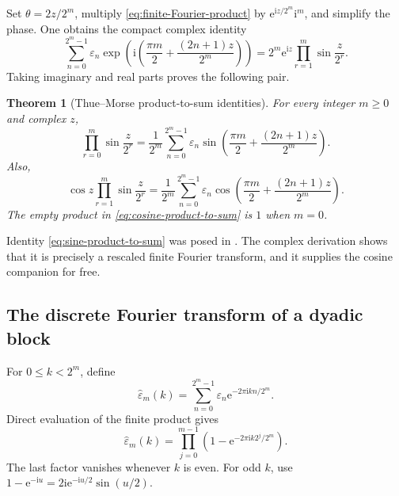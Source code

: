 \documentclass[11pt,oneside]{article}
\newtheorem{theorem}{Theorem}[section]
\theoremstyle{definition}
\theoremstyle{remark}
\newcommand{\e}{\mathrm e}
\newcommand{\ii}{\mathrm i}
\newcommand{\eps}{\varepsilon}
\begin{document}
Set \(\theta=2z/2^m\), multiply
\eqref{eq:finite-Fourier-product} by
\(\e^{\ii z/2^m}\ii^m\), and simplify the phase.  One obtains the compact
complex identity
\begin{equation}
  \sum_{n=0}^{2^m-1}\eps_n
   \exp\!\left(\ii\left(
      \frac{\pi m}{2}+\frac{(2n+1)z}{2^m}
   \right)\right)
  =2^m\e^{\ii z}\prod_{r=1}^{m}\sin\frac{z}{2^r}.
  \label{eq:complex-product-to-sum}
\end{equation}
Taking imaginary and real parts proves the following pair.

\begin{theorem}[Thue--Morse product-to-sum identities]
For every integer \(m\ge0\) and complex \(z\),
\begin{equation}
  \boxed{
  \prod_{r=0}^{m}\sin\frac{z}{2^r}
   =\frac1{2^m}\sum_{n=0}^{2^m-1}\eps_n
     \sin\!\left(
       \frac{\pi m}{2}+\frac{(2n+1)z}{2^m}
     \right).}
  \label{eq:sine-product-to-sum}
\end{equation}
Also,
\begin{equation}
  \boxed{
  \cos z\prod_{r=1}^{m}\sin\frac{z}{2^r}
   =\frac1{2^m}\sum_{n=0}^{2^m-1}\eps_n
     \cos\!\left(
       \frac{\pi m}{2}+\frac{(2n+1)z}{2^m}
     \right).}
  \label{eq:cosine-product-to-sum}
\end{equation}
The empty product in \eqref{eq:cosine-product-to-sum} is \(1\) when \(m=0\).
\end{theorem}

Identity \eqref{eq:sine-product-to-sum} was posed in
\cite{reshetnikovTrigProducts}.  The complex derivation shows that it is
precisely a rescaled finite Fourier transform, and it supplies the cosine
companion for free.

\subsection{The discrete Fourier transform of a dyadic block}

For \(0\le k<2^m\), define
\begin{equation}
  \widehat\eps_m(k)=
  \sum_{n=0}^{2^m-1}\eps_n
    \e^{-2\pi\ii kn/2^m}.
  \label{eq:DFT-definition}
\end{equation}
Direct evaluation of the finite product gives
\begin{equation}
  \widehat\eps_m(k)=
  \prod_{j=0}^{m-1}
    \left(1-\e^{-2\pi\ii k2^j/2^m}\right).
  \label{eq:DFT-product}
\end{equation}
The last factor vanishes whenever \(k\) is even.  For odd \(k\), use
\(1-\e^{-\ii u}=2\ii\e^{-\ii u/2}\sin(u/2)\).
\end{document}
